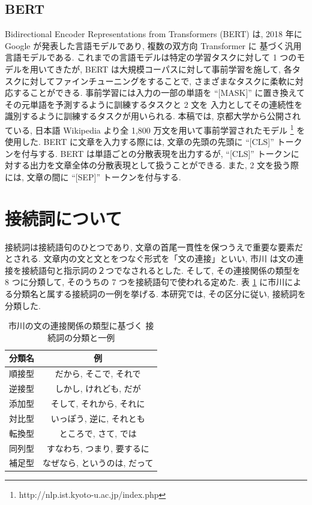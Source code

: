 \documentclass[twocolumn]{jarticle}     %
\begin{document}
\subsection{BERT}
Bidirectional Encoder Representations from Transformers (BERT)
 \cite{devlin2018bert} は, 2018 年に Google が発表した言語モデルであり,
複数の双方向 Transformer に
基づく汎用言語モデルである.
これまでの言語モデルは特定の学習タスクに対して 1 つのモデルを用いてきたが,
BERT は大規模コーパスに対して事前学習を施して, 各タスクに対してファインチューニングをすることで,
さまざまなタスクに柔軟に対応することができる.
事前学習には入力の一部の単語を ``[MASK]'' に置き換えてその元単語を予測するように訓練するタスクと 2 文を
入力としてその連続性を識別するように訓練するタスクが用いられる.
本稿では, 京都大学から公開されている,
日本語 Wikipedia より全 1,800 万文を用いて事前学習されたモデル
\footnote{http:\slash\slash{}nlp.ist.kyoto-u.ac.jp\slash{}index.php}
を使用した.
BERT に文章を入力する際には, 文章の先頭の先頭に ``[CLS]'' トークンを付与する.
BERT は単語ごとの分散表現を出力するが,
``[CLS]'' トークンに対する出力を文章全体の分散表現として扱うことができる.
また, 2 文を扱う際には, 文章の間に ``[SEP]'' トークンを付与する.

\section{接続詞について}
接続詞は接続語句のひとつであり, 文章の首尾一貫性を保つうえで重要な要素だとされる.
文章内の文と文とをつなぐ形式を「文の連接」といい,
市川 \cite{ichikawa}は文の連接を接続語句と指示詞の２つでなされるとした. そして,
その連接関係の類型を 8 つに分類して, そのうちの 7 つを接続語句で使われる定めた.
表 \ref{bunrui} に市川による分類名と属する接続詞の一例を挙げる.
本研究では, その区分に従い, 接続詞を分類した.
\begin{table}[ht] %
	\begin{center}
		\caption{市川の文の連接関係の類型に基づく \protect\linebreak   接続詞の分類と一例}
		\label{bunrui}
		\begin{tabular}{|c|c|}
			\hline
			分類名 &例 \\ \hline \hline
			順接型 & だから, そこで, それで   \\ \hline
			逆接型 & しかし, けれども, だが \\ \hline
			添加型 & そして, それから, それに \\ \hline
			対比型 & いっぽう, 逆に, それとも  \\ \hline
			転換型 & ところで, さて, では \\ \hline
			同列型 & すなわち, つまり, 要するに  \\ \hline
      補足型 & なぜなら, というのは, だって  \\ \hline
		\end{tabular}
	\end{center}
\end{table}
\end{document}
